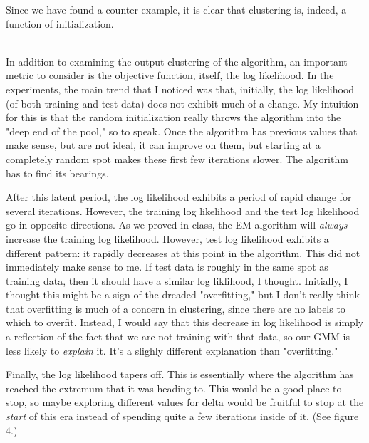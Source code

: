 \documentclass{article}
\begin{document}
Since we have found a counter-example, it is clear that clustering is, indeed, 
a function of initialization.

~\\

In addition to examining the output clustering of the algorithm, an important 
metric to consider is the objective function, itself, the log likelihood. In the 
experiments, the main trend that I noticed was that, initially, the log 
likelihood (of both training and test data) does not exhibit much of a change. 
My intuition for this is that the random initialization really throws the 
algorithm into the "deep end of the pool," so to speak. Once the algorithm has 
previous values that make sense, but are not ideal, it can improve on them, but 
starting at a completely random spot makes these first few iterations slower. 
The algorithm has to find its bearings.

After this latent period, the log 
likelihood exhibits a period of rapid change for several iterations. However, 
the training log likelihood and the test log likelihood go in opposite 
directions. As we proved in class, the EM algorithm will \textit{always} 
increase the training log likelihood. However, test log likelihood exhibits a 
different pattern: it rapidly decreases at this point in the algorithm. This did 
not immediately make sense to me. If test data is roughly in the same spot as 
training data, then it should have a similar log liklihood, I thought.
Initially, I thought this might be a sign of the dreaded "overfitting," but I 
don't really think that overfitting is much of a concern in clustering, since 
there are no labels to which to overfit. Instead, I would say that this decrease in 
log likelihood is simply a reflection of the fact that we are not training with 
that data, so our GMM is less likely to \textit{explain} it. It's a slighly 
different explanation than "overfitting."

Finally, the log likelihood tapers off. This is essentially where the algorithm has 
reached the extremum that it was heading to. This would be a good place to stop, 
so maybe exploring different values for delta would be fruitful to stop at the 
\textit{start} of this era instead of spending quite a few iterations inside of it. (See figure 4.)
\end{document}

